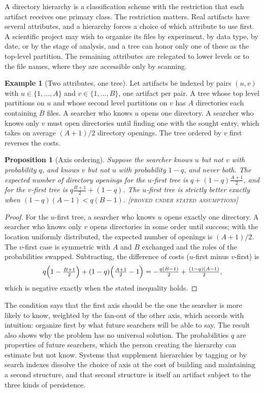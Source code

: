 \documentclass[11pt,twoside,openright]{book}
\theoremstyle{plain}
\newtheorem{proposition}[theorem]{Proposition}
\theoremstyle{definition}
\newtheorem{example}[theorem]{Example}
\theoremstyle{remark}
\newcommand{\Proved}{\textup{\textsc{[proved under stated assumptions]}}}
\begin{document}
A directory hierarchy is a classification scheme with the restriction that each artifact receives one primary class. The restriction matters. Real artifacts have several attributes, and a hierarchy forces a choice of which attribute to use first. A scientific project may wish to organize its files by experiment, by data type, by date, or by the stage of analysis, and a tree can honor only one of these as the top-level partition. The remaining attributes are relegated to lower levels or to the file names, where they are accessible only by scanning.

\begin{example}[Two attributes, one tree]\label{ex:twoattr}
Let artifacts be indexed by pairs $(u,v)$ with $u\in\{1,\dots,A\}$ and $v\in\{1,\dots,B\}$, one artifact per pair. A tree whose top level partitions on $u$ and whose second level partitions on $v$ has $A$ directories each containing $B$ files. A searcher who knows $u$ opens one directory. A searcher who knows only $v$ must open directories until finding one with the sought entry, which takes on average $(A+1)/2$ directory openings. The tree ordered by $v$ first reverses the costs.
\end{example}

\begin{proposition}[Axis ordering]\label{prop:axis}
Suppose the searcher knows $u$ but not $v$ with probability $q$, and knows $v$ but not $u$ with probability $1-q$, and never both. The expected number of directory openings for the $u$-first tree is $q+(1-q)\tfrac{A+1}{2}$, and for the $v$-first tree is $q\tfrac{B+1}{2}+(1-q)$. The $u$-first tree is strictly better exactly when $(1-q)(A-1)<q(B-1)$.
\Proved{}
\end{proposition}

\begin{proof}
For the $u$-first tree, a searcher who knows $u$ opens exactly one directory. A searcher who knows only $v$ opens directories in some order until success; with the location uniformly distributed, the expected number of openings is $(A+1)/2$. The $v$-first case is symmetric with $A$ and $B$ exchanged and the roles of the probabilities swapped. Subtracting, the difference of costs ($u$-first minus $v$-first) is
\[
q\Bigl(1-\tfrac{B+1}{2}\Bigr)+(1-q)\Bigl(\tfrac{A+1}{2}-1\Bigr)=-\tfrac{q(B-1)}{2}+\tfrac{(1-q)(A-1)}{2},
\]
which is negative exactly when the stated inequality holds.
\end{proof}

The condition says that the first axis should be the one the searcher is more likely to know, weighted by the fan-out of the other axis, which accords with intuition: organize first by what future searchers will be able to say. The result also shows why the problem has no universal solution. The probabilities $q$ are properties of future searchers, which the person creating the hierarchy can estimate but not know. Systems that supplement hierarchies by tagging or by search indexes dissolve the choice of axis at the cost of building and maintaining a second structure, and that second structure is itself an artifact subject to the three kinds of persistence.
\end{document}
